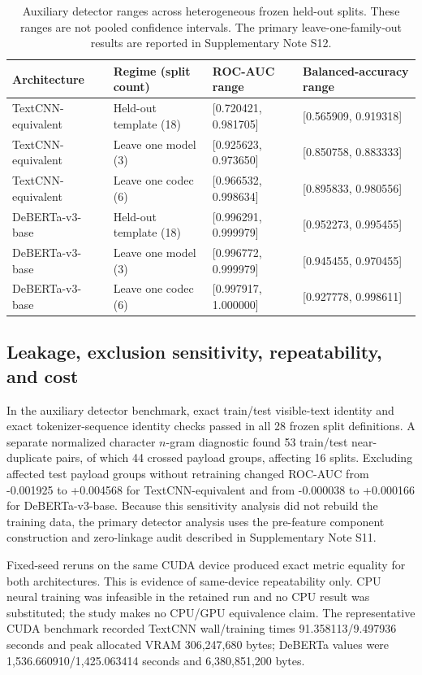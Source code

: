 \documentclass[fleqn,10pt]{wlscirep}
\begin{document}
\begin{table}[H]
\centering
\small
\begin{tabularx}{\textwidth}{L{0.22\textwidth}L{0.19\textwidth}L{0.22\textwidth}Y}
\toprule
Architecture & Regime (split count) & ROC-AUC range & Balanced-accuracy range \\
\midrule
TextCNN-equivalent & Held-out template (18) & [0.720421, 0.981705] & [0.565909, 0.919318] \\
TextCNN-equivalent & Leave one model (3) & [0.925623, 0.973650] & [0.850758, 0.883333] \\
TextCNN-equivalent & Leave one codec (6) & [0.966532, 0.998634] & [0.895833, 0.980556] \\
DeBERTa-v3-base & Held-out template (18) & [0.996291, 0.999979] & [0.952273, 0.995455] \\
DeBERTa-v3-base & Leave one model (3) & [0.996772, 0.999979] & [0.945455, 0.970455] \\
DeBERTa-v3-base & Leave one codec (6) & [0.997917, 1.000000] & [0.927778, 0.998611] \\
\bottomrule
\end{tabularx}
\caption{\label{tab:detector-ranges} Auxiliary detector ranges across heterogeneous frozen held-out splits. These ranges are not pooled confidence intervals. The primary leave-one-family-out results are reported in Supplementary Note S12.}
\end{table}

\subsection*{Leakage, exclusion sensitivity, repeatability, and cost}

In the auxiliary detector benchmark, exact train/test visible-text identity and exact tokenizer-sequence identity checks passed in all 28 frozen split definitions. A separate normalized character \(n\)-gram diagnostic found 53 train/test near-duplicate pairs, of which 44 crossed payload groups, affecting 16 splits. Excluding affected test payload groups without retraining changed ROC-AUC from -0.001925 to +0.004568 for TextCNN-equivalent and from -0.000038 to +0.000166 for DeBERTa-v3-base. Because this sensitivity analysis did not rebuild the training data, the primary detector analysis uses the pre-feature component construction and zero-linkage audit described in Supplementary Note S11.

Fixed-seed reruns on the same CUDA device produced exact metric equality for both architectures. This is evidence of same-device repeatability only. CPU neural training was infeasible in the retained run and no CPU result was substituted; the study makes no CPU/GPU equivalence claim. The representative CUDA benchmark recorded TextCNN wall/training times 91.358113/9.497936 seconds and peak allocated VRAM 306,247,680 bytes; DeBERTa values were 1,536.660910/1,425.063414 seconds and 6,380,851,200 bytes.
\end{document}

